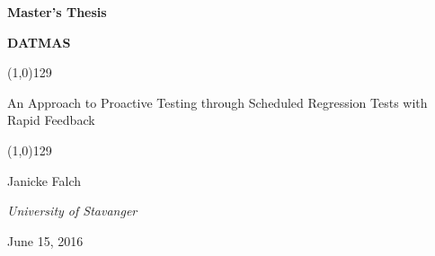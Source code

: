 
\begin{titlepage}
\begin{center}

\vspace*{1cm}


{\Huge{\bfseries  Master's Thesis}}

\vspace{0.2cm}


{\LARGE{\bfseries DATMAS}}


\linethickness{1.2pt}
\color{uisblue}
\line(1,0){129}
\color{black}

\vspace{0.5cm}


{\Large An Approach to Proactive Testing through Scheduled Regression Tests with Rapid Feedback}


\vspace{1.5cm}

\begin{figure}[ht]
\centering
\end{figure}

\vspace{2cm}


\color{uisblue}
\line(1,0){129}
\color{black}

\vspace{.05cm}


{\large Janicke Falch }

\vspace{1.3cm}

{\large \textit{University of Stavanger}}

\vspace{0.1cm}


{\large June 15, 2016}

\end{center}
\end{titlepage}
